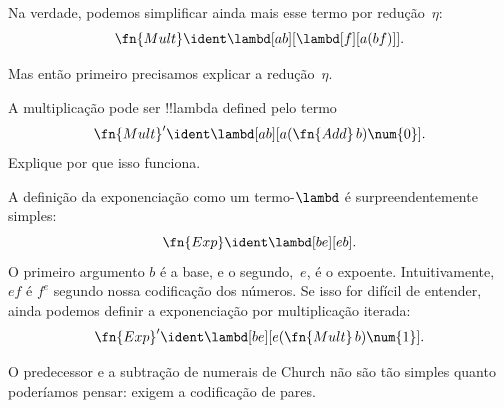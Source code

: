 \documentclass[../../../include/open-logic-section]{subfiles}
\begin{document}
\begin{editorial}
Na verdade, podemos simplificar ainda mais esse termo por redução~$\eta$:
\[
  \fn{Mult} \ident \lambd[ab][\lambd[f][a (b f)]].
\]

Mas então primeiro precisamos explicar a redução~$\eta$.
\end{editorial}

\begin{prob}
A multiplicação pode ser !!{lambda define}d pelo termo
\[
  \fn{Mult}' \ident \lambd[ab][a (\fn{Add}\, b) \num{0}].
\]
Explique por que isso funciona.
\end{prob}

A definição da exponenciação como um termo-$\lambd$ é
surpreendentemente simples:
\[
  \fn{Exp} \ident \lambd[be][e b].
\]
O primeiro argumento $b$ é a base, e o segundo,~$e$, é o expoente.
Intuitivamente, $e f$ é $f^e$ segundo nossa codificação dos números. Se isso
for difícil de entender, ainda podemos definir a exponenciação por
multiplicação iterada:
\[
  \fn{Exp}' \ident \lambd[be][e (\fn{Mult}\, b) \num{1}].
\]

O predecessor e a subtração de numerais de Church não são tão simples quanto
poderíamos pensar: exigem a codificação de pares.
\end{document}
